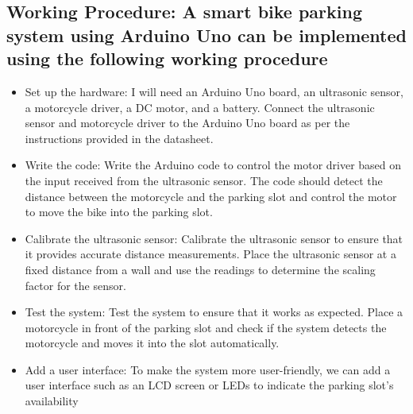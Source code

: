 \documentclass[conference]{IEEEtran}
\begin{document}
	\subsection {Working Procedure: A smart bike parking system using Arduino Uno can be implemented using the following working procedure}
	\begin{itemize}
		\item Set up the hardware: I will need an Arduino Uno board, an ultrasonic sensor, a motorcycle driver, a DC motor, and a battery. Connect the ultrasonic sensor and motorcycle driver to the Arduino Uno board as per the instructions provided in the datasheet.
		\item Write the code: Write the Arduino code to control the motor driver based on the input received from the ultrasonic sensor. The code should detect the distance between the motorcycle and the parking slot and control the motor to move the bike into the parking slot.
		\item Calibrate the ultrasonic sensor: Calibrate the ultrasonic sensor to ensure that it provides accurate distance measurements. Place the ultrasonic sensor at a fixed distance from a wall and use the readings to determine the scaling factor for the sensor.
		\item Test the system: Test the system to ensure that it works as expected. Place a motorcycle in front of the parking slot and check if the system detects the motorcycle and moves it into the slot automatically.
		\item  Add a user interface: To make the system more user-friendly, we can add a user interface such as an LCD screen or LEDs to indicate the parking slot's availability

\end{itemize}
\end{document}

